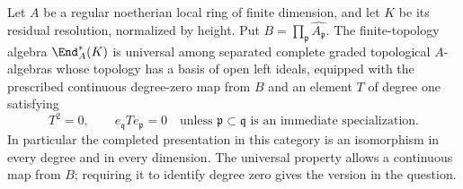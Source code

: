\begin{theorem}\label{i:linearuniversal}
Let $A$ be a regular noetherian local ring of finite dimension, and
let $K$ be its residual resolution, normalized by height. Put
$B=\prod_{\mathfrak p}\widehat{A_{\mathfrak p}}$.
The finite-topology algebra $\End_A^*(K)$ is universal among
separated complete graded topological $A$-algebras whose topology
has a basis of open left ideals, equipped with the prescribed
continuous degree-zero map from $B$ and an element $T$ of degree one
satisfying
\[
 T^2=0,\qquad e_{\mathfrak q}Te_{\mathfrak p}=0
 \quad\text{unless }\mathfrak p\subset\mathfrak q
 \text{ is an immediate specialization}.
\]
In particular the completed presentation in this category is an
isomorphism in every degree and in every dimension. The universal
property allows a continuous map from $B$; requiring it to identify
degree zero gives the version in the question.
\end{theorem}

